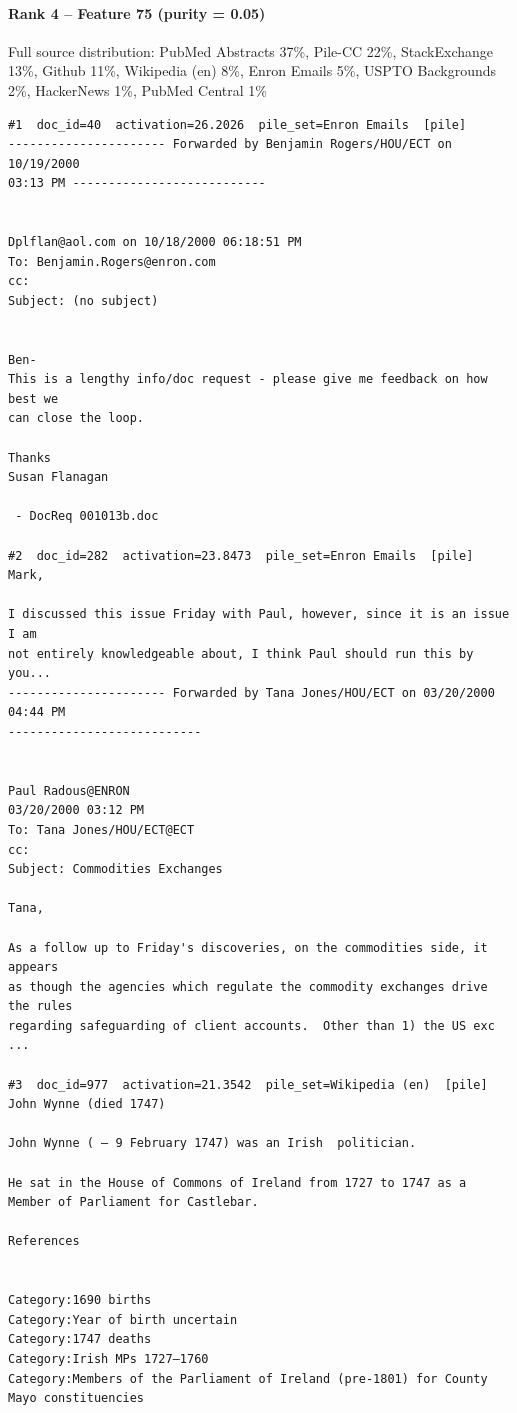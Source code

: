 \paragraph*{Rank 4 -- Feature 75 (purity = 0.05)}

Full source distribution: PubMed Abstracts 37\%, Pile-CC 22\%, StackExchange 13\%, Github 11\%, Wikipedia (en) 8\%, Enron Emails 5\%, USPTO Backgrounds 2\%, HackerNews 1\%, PubMed Central 1\%

\begin{verbatim}
#1  doc_id=40  activation=26.2026  pile_set=Enron Emails  [pile]
---------------------- Forwarded by Benjamin Rogers/HOU/ECT on 10/19/2000 
03:13 PM ---------------------------


Dplflan@aol.com on 10/18/2000 06:18:51 PM
To: Benjamin.Rogers@enron.com
cc:  
Subject: (no subject)


Ben-
This is a lengthy info/doc request - please give me feedback on how best we
can close the loop.

Thanks
Susan Flanagan

 - DocReq 001013b.doc

#2  doc_id=282  activation=23.8473  pile_set=Enron Emails  [pile]
Mark,

I discussed this issue Friday with Paul, however, since it is an issue I am 
not entirely knowledgeable about, I think Paul should run this by you...
---------------------- Forwarded by Tana Jones/HOU/ECT on 03/20/2000 04:44 PM 
---------------------------


Paul Radous@ENRON
03/20/2000 03:12 PM
To: Tana Jones/HOU/ECT@ECT
cc:  
Subject: Commodities Exchanges

Tana,

As a follow up to Friday's discoveries, on the commodities side, it appears 
as though the agencies which regulate the commodity exchanges drive the rules 
regarding safeguarding of client accounts.  Other than 1) the US exc ...

#3  doc_id=977  activation=21.3542  pile_set=Wikipedia (en)  [pile]
John Wynne (died 1747)

John Wynne ( – 9 February 1747) was an Irish  politician.

He sat in the House of Commons of Ireland from 1727 to 1747 as a Member of Parliament for Castlebar.

References 
 

Category:1690 births
Category:Year of birth uncertain
Category:1747 deaths
Category:Irish MPs 1727–1760
Category:Members of the Parliament of Ireland (pre-1801) for County Mayo constituencies


\end{verbatim}
